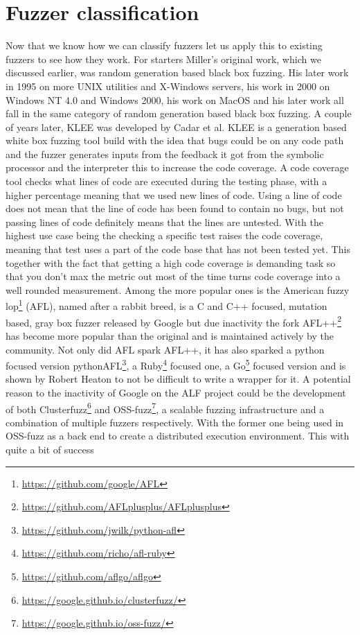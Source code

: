 \section{Fuzzer classification}
Now that we know how we can classify fuzzers let us apply this to existing fuzzers to see how they work. For starters Miller's original work, which we discussed earlier, was random generation based black box fuzzing. His later work in 1995 on more UNIX utilities and X-Windows servers\cite{26miller1995fuzzrevisited}, his work in 2000 on Windows NT 4.0 and Windows 2000\cite{24MillerWindows}, his work on MacOS \cite{25MillerOnMacOS} and his later work\cite{3miller2020relevanceOfClasicalFuzzTesting} all fall in the same category of random generation based black box fuzzing.
A couple of years later, KLEE was developed\cite{8KLEE} by Cadar et al. KLEE is a generation based white box fuzzing tool build with the idea that bugs could be on any code path and the fuzzer generates inputs from the feedback it got from the symbolic processor and the interpreter this to increase the code coverage. A code coverage tool checks what lines of code are executed during the testing phase, with a higher percentage meaning that we used new lines of code.
Using a line of code does not mean that the line of code has been found to contain no bugs, but not passing lines of code definitely means that the lines are untested. With the highest use case being the checking a specific test raises the code coverage, meaning that test uses a part of the code base that has not been tested yet. This together with the fact that getting a high code coverage is demanding task so that you don't max the metric out most of the time turns code coverage into a well rounded measurement.
Among the more popular ones is the American fuzzy lop\footnote{\url{https://github.com/google/AFL}} (AFL), named after a rabbit breed, is a C and C++ focused, mutation based, gray box fuzzer released by Google but due inactivity the fork AFL++\cite{27AFL++}\footnote{\url{https://github.com/AFLplusplus/AFLplusplus}} has become more popular than the original and is maintained actively by the community. Not only did AFL spark AFL++, it has also sparked a python focused version pythonAFL\footnote{\url{https://github.com/jwilk/python-afl}}, a  Ruby\footnote{\url{https://github.com/richo/afl-ruby}} focused one, a Go\footnote{\url{https://github.com/aflgo/aflgo}} focused version and is shown by Robert Heaton\cite{AFLWrapper} to not be difficult to write a wrapper for it. A potential reason to the inactivity of Google on the ALF project could be the development of both Clusterfuzz\footnote{\url{https://google.github.io/clusterfuzz/}} and OSS-fuzz\footnote{\url{https://google.github.io/oss-fuzz/}}, a  scalable fuzzing infrastructure and a combination of multiple fuzzers respectively. With the former one being used in OSS-fuzz as a back end to create a distributed execution environment. This with quite a bit of success\cite{31OSS-FuzzBugs}
